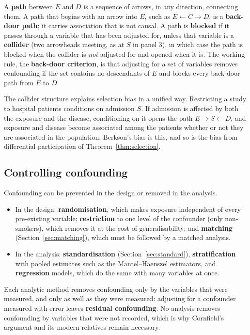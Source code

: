 \documentclass[11pt,a4paper]{article}
\numberwithin{equation}{section}
\theoremstyle{definition}
\begin{document}
A \textbf{path} between $E$ and $D$ is a sequence of arrows, in any direction, connecting them. A path that begins with an arrow into $E$, such as
$E \leftarrow C \to D$, is a \textbf{back-door path}; it carries association that is not causal. A path is \textbf{blocked} if it passes through a variable
that has been adjusted for, unless that variable is a \textbf{collider} (two arrowheads meeting, as at $S$ in panel 3), in which case the path is
blocked when the collider is \emph{not} adjusted for and opened when it is. The working rule, the \textbf{back-door criterion}, is that
adjusting for a set of variables removes confounding if the set contains no descendants of $E$ and blocks every back-door path from $E$ to $D$.

The collider structure explains selection bias in a unified way. Restricting a study to hospital patients conditions on admission $S$.
If admission is affected by both the exposure and the disease, conditioning on it opens the path $E \to S \leftarrow D$, and exposure and
disease become associated among the patients whether or not they are associated in the population. Berkson's bias is this, and so is
the bias from differential participation of Theorem~\ref{thm:selection}.

\subsection{Controlling confounding}

Confounding can be prevented in the design or removed in the analysis.
\begin{itemize}
\item In the design: \textbf{randomisation}, which makes exposure independent of every pre-existing variable; \textbf{restriction} to one
level of the confounder (only non-smokers), which removes it at the cost of generalisability; and \textbf{matching}
(Section~\ref{sec:matching}), which must be followed by a matched analysis.
\item In the analysis: \textbf{standardisation} (Section~\ref{sec:standard}), \textbf{stratification} with pooled estimates such as the
Mantel--Haenszel estimators, and \textbf{regression} models, which do the same with many variables at once.
\end{itemize}
Each analytic method removes confounding only by the variables that were measured, and only as well as they were measured: adjusting
for a confounder measured with error leaves \textbf{residual confounding}. No analysis removes confounding by variables that were not
recorded, which is why Cornfield's argument and its modern relatives remain necessary.
\end{document}
